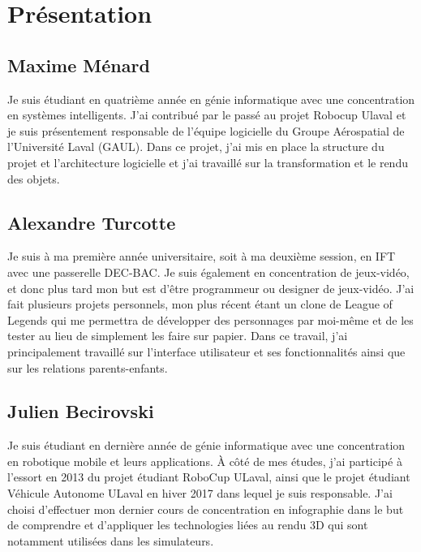 \section{Présentation}
\label{s:présentation}

\subsection{Maxime Ménard}
Je suis étudiant en quatrième année en génie informatique avec une concentration en systèmes intelligents.
J'ai contribué par le passé au projet Robocup Ulaval et je suis présentement responsable de l'équipe logicielle du Groupe Aérospatial de l'Université Laval (GAUL).
Dans ce projet, j'ai mis en place la structure du projet et l'architecture logicielle et j'ai travaillé sur la transformation et le rendu des objets.

\subsection{Alexandre Turcotte}
Je suis à ma première année universitaire, soit à ma deuxième session, en IFT avec une passerelle DEC-BAC.
Je suis également en concentration de jeux-vidéo, et donc plus tard mon but est d’être programmeur ou designer de jeux-vidéo.
J’ai fait plusieurs projets personnels, mon plus récent étant un clone de League of Legends qui me permettra de développer des personnages par moi-même et de les tester au lieu de simplement les faire sur papier.
Dans ce travail, j’ai principalement travaillé sur l’interface utilisateur et ses fonctionnalités ainsi que sur les relations parents-enfants.

\subsection{Julien Becirovski}
Je suis étudiant en dernière année de génie informatique avec une concentration en robotique mobile et leurs applications. À côté de mes études, j'ai participé à l'essort en 2013 du projet étudiant RoboCup ULaval, ainsi que le projet étudiant Véhicule Autonome ULaval en hiver 2017 dans lequel je suis responsable. J'ai choisi d'effectuer mon dernier cours de concentration en infographie dans le but de comprendre et d'appliquer les technologies liées au rendu 3D qui sont notamment utilisées dans les simulateurs.